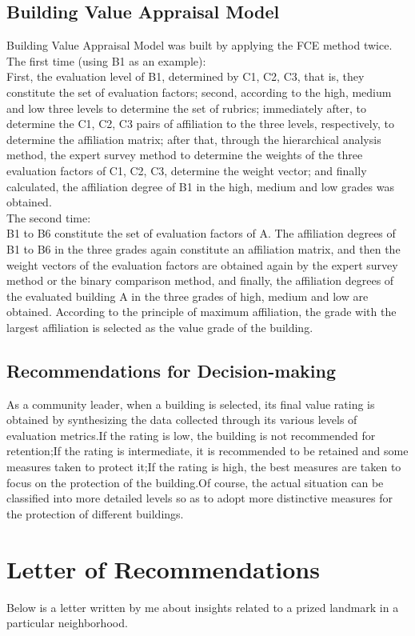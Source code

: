 \documentclass{mcmthesis}
\begin{document}
\subsection{Building Value Appraisal Model}
Building Value Appraisal Model was built by applying the FCE method twice.
The first time (using B1 as an example):\\
First, the evaluation level of B1, determined by C1, C2, C3, that is, they constitute the set of evaluation factors; second, according to the high, medium and low three levels to determine the set of rubrics; immediately after, to determine the C1, C2, C3 pairs of affiliation to the three levels, respectively, to determine the affiliation matrix; after that, through the hierarchical analysis method, the expert survey method to determine the weights of the three evaluation factors of C1, C2, C3, determine the weight vector; and finally calculated, the affiliation degree of B1 in the high, medium and low grades was obtained.\\
The second time:\\
 B1 to B6 constitute the set of evaluation factors of A. The affiliation degrees of B1 to B6 in the three grades again constitute an affiliation matrix, and then the weight vectors of the evaluation factors are obtained again by the expert survey method or the binary comparison method, and finally, the affiliation degrees of the evaluated building A in the three grades of high, medium and low are obtained. According to the principle of maximum affiliation, the grade with the largest affiliation is selected as the value grade of the building.
\subsection{Recommendations for Decision-making}
As a community leader, when a building is selected, its final value rating is obtained by synthesizing the data collected through its various levels of evaluation metrics.If the rating is low, the building is not recommended for retention;If the rating is intermediate, it is recommended to be retained and some measures taken to protect it;If the rating is high, the best measures are taken to focus on the protection of the building.Of course, the actual situation can be classified into more detailed levels so as to adopt more distinctive measures for the protection of different buildings.
\section{Letter of Recommendations}
Below is a letter written by me about insights related to a prized landmark in a particular neighborhood.
\end{document}
